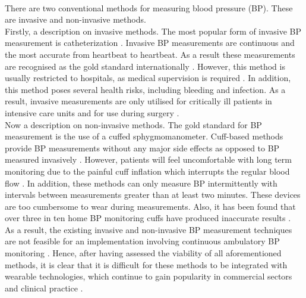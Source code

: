 \documentclass[11pt, a4paper]{article}
\begin{document}
\begin{figure}[H]
\end{figure} \\ \newline \noindent There are two  conventional  methods  for  measuring  blood  pressure (BP). These are invasive   and   non-invasive methods. \\ \newline \noindent Firstly, a description on invasive methods. The most popular form of invasive  BP measurement is  catheterization \cite{Zaki2018}. Invasive BP measurements are continuous and the most accurate from heartbeat to heartbeat. As a result these measurements are recognised as the gold standard internationally \cite{Sharma2017} \cite{ElHajj2020}. However, this method is usually restricted to hospitals, as medical supervision is required \cite{Pradenas2020}. In addition, this method poses several health risks, including bleeding and infection. As a result, invasive measurements are only utilised for critically ill patients in intensive care units and for use during surgery \cite{Zaki2018}\cite{ElHajj2020}. \\ \newline \noindent Now a description on non-invasive methods. The gold standard for BP measurement is the use of a cuffed sphygmomanometer. Cuff-based methods provide BP measurements without any major side effects as opposed to BP measured invasively \cite{ElHajj2020}. However, patients will feel uncomfortable with long term monitoring due to the painful cuff inflation which interrupts the regular blood flow \cite{Tanveer2018}. In addition, these methods can only measure BP intermittently with intervals between measurements greater than at least two minutes. These devices are too cumbersome to wear during measurements. Also, it has been found that over three in ten home BP monitoring cuffs have produced inaccurate results \cite{Leung2016}. \\ \newline \noindent  As a result, the existing invasive and non-invasive BP measurement techniques are not feasible for an implementation involving continuous ambulatory BP monitoring \cite{ElHajj2020}. Hence, after having assessed the viability of all aforementioned methods, it is clear that it is difficult for these methods to be integrated with wearable technologies, which continue to gain popularity in commercial sectors and clinical practice \cite{Sharma2017}.
\end{document}
